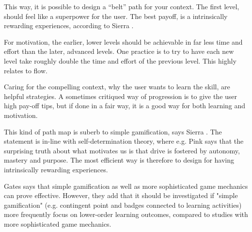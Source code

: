 This way, it is possible to design a “belt” path for your context. The first level, should feel like a superpower for the user. The best payoff, is a intrinsically rewarding experiences, according to Sierra \cite{sierra}.

For motivation, the earlier, lower levels should be achievable in far less time and effort than the later, advanced levels. One practice is to try to have each new level take roughly double the time and effort of the previous level. This highly relates to flow.

Caring for the compelling context, why the user wants to learn the skill, are helpful strategies. A sometimes critiqued way of progression is to give the user high pay-off tips, but if done in a fair way, it is a good way for both learning and motivation.

This kind of path map is suberb to simple gamification, says Sierra \cite{sierra}. The statement is in-line with self-determination theory, where e.g. Pink \cite{pink} says that the surprising truth about what motivates us is that drive is fostered by autonomy, mastery and purpose. The most efficient way is therefore to design for having intrinsically rewarding experiences.

Gates \cite{sierra} says that simple gamification as well as more sophisticated game mechanics can prove effective. However, they add that it should be investigated if "simple gamification" (e.g. contingent point and badges connected to learning activities) more frequently focus on lower-order learning outcomes, compared to studies with more sophisticated game mechanics.
